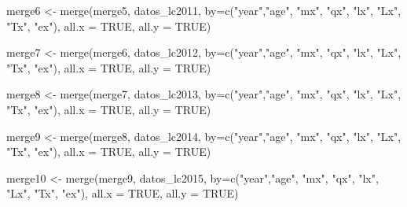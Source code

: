 \documentclass[
]{article}
\newenvironment{Shaded}{\begin{snugshade}}{\end{snugshade}}
\newcommand{\AttributeTok}[1]{\textcolor[rgb]{0.77,0.63,0.00}{#1}}
\newcommand{\ConstantTok}[1]{\textcolor[rgb]{0.00,0.00,0.00}{#1}}
\newcommand{\FunctionTok}[1]{\textcolor[rgb]{0.00,0.00,0.00}{#1}}
\newcommand{\NormalTok}[1]{#1}
\newcommand{\OtherTok}[1]{\textcolor[rgb]{0.56,0.35,0.01}{#1}}
\newcommand{\StringTok}[1]{\textcolor[rgb]{0.31,0.60,0.02}{#1}}
\begin{document}
\begin{Shaded}
\begin{Highlighting}[]
\NormalTok{merge6 }\OtherTok{\textless{}{-}} \FunctionTok{merge}\NormalTok{(merge5, datos\_lc2011, }\AttributeTok{by=}\FunctionTok{c}\NormalTok{(}\StringTok{"year"}\NormalTok{,}\StringTok{"age"}\NormalTok{, }\StringTok{"mx"}\NormalTok{, }\StringTok{"qx"}\NormalTok{, }\StringTok{"lx"}\NormalTok{, }\StringTok{"Lx"}\NormalTok{, }\StringTok{"Tx"}\NormalTok{, }\StringTok{"ex"}\NormalTok{), }\AttributeTok{all.x =} \ConstantTok{TRUE}\NormalTok{, }\AttributeTok{all.y =} \ConstantTok{TRUE}\NormalTok{)}

\NormalTok{merge7 }\OtherTok{\textless{}{-}} \FunctionTok{merge}\NormalTok{(merge6, datos\_lc2012, }\AttributeTok{by=}\FunctionTok{c}\NormalTok{(}\StringTok{"year"}\NormalTok{,}\StringTok{"age"}\NormalTok{, }\StringTok{"mx"}\NormalTok{, }\StringTok{"qx"}\NormalTok{, }\StringTok{"lx"}\NormalTok{, }\StringTok{"Lx"}\NormalTok{, }\StringTok{"Tx"}\NormalTok{, }\StringTok{"ex"}\NormalTok{), }\AttributeTok{all.x =} \ConstantTok{TRUE}\NormalTok{, }\AttributeTok{all.y =} \ConstantTok{TRUE}\NormalTok{)}

\NormalTok{merge8 }\OtherTok{\textless{}{-}} \FunctionTok{merge}\NormalTok{(merge7, datos\_lc2013, }\AttributeTok{by=}\FunctionTok{c}\NormalTok{(}\StringTok{"year"}\NormalTok{,}\StringTok{"age"}\NormalTok{, }\StringTok{"mx"}\NormalTok{, }\StringTok{"qx"}\NormalTok{, }\StringTok{"lx"}\NormalTok{, }\StringTok{"Lx"}\NormalTok{, }\StringTok{"Tx"}\NormalTok{, }\StringTok{"ex"}\NormalTok{), }\AttributeTok{all.x =} \ConstantTok{TRUE}\NormalTok{, }\AttributeTok{all.y =} \ConstantTok{TRUE}\NormalTok{)}

\NormalTok{merge9 }\OtherTok{\textless{}{-}} \FunctionTok{merge}\NormalTok{(merge8, datos\_lc2014, }\AttributeTok{by=}\FunctionTok{c}\NormalTok{(}\StringTok{"year"}\NormalTok{,}\StringTok{"age"}\NormalTok{, }\StringTok{"mx"}\NormalTok{, }\StringTok{"qx"}\NormalTok{, }\StringTok{"lx"}\NormalTok{, }\StringTok{"Lx"}\NormalTok{, }\StringTok{"Tx"}\NormalTok{, }\StringTok{"ex"}\NormalTok{), }\AttributeTok{all.x =} \ConstantTok{TRUE}\NormalTok{, }\AttributeTok{all.y =} \ConstantTok{TRUE}\NormalTok{)}

\NormalTok{merge10 }\OtherTok{\textless{}{-}} \FunctionTok{merge}\NormalTok{(merge9, datos\_lc2015, }\AttributeTok{by=}\FunctionTok{c}\NormalTok{(}\StringTok{"year"}\NormalTok{,}\StringTok{"age"}\NormalTok{, }\StringTok{"mx"}\NormalTok{, }\StringTok{"qx"}\NormalTok{, }\StringTok{"lx"}\NormalTok{, }\StringTok{"Lx"}\NormalTok{, }\StringTok{"Tx"}\NormalTok{, }\StringTok{"ex"}\NormalTok{), }\AttributeTok{all.x =} \ConstantTok{TRUE}\NormalTok{, }\AttributeTok{all.y =} \ConstantTok{TRUE}\NormalTok{)}


\end{Highlighting}
\end{Shaded}
\end{document}
